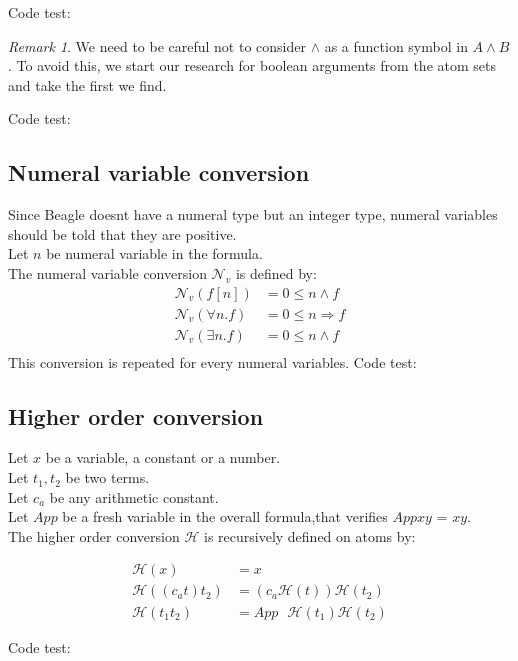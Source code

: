 \documentclass[a4paper, 11pt]{article}
\theoremstyle{plain}
\theoremstyle{definition}
\theoremstyle{remark}
\newtheorem*{remark}{Remark}
\begin{document}
Code test:

\begin{remark}
We need to be careful not to consider $\wedge$ as a function symbol in $A \wedge B$ . To avoid this, we start our research for boolean arguments from the atom sets and take the first we find.
\end{remark}

Code test:

\subsection{Numeral variable conversion}
Since Beagle doesnt have a numeral type but an integer type, numeral variables should be told that they are positive.
\\Let $n$ be numeral variable in the formula.
\\The numeral variable conversion $\mathcal{N}_v$ is defined by:
\[\begin{aligned}
  \mathcal{N}_v(f[n]) &= 0 \leq n \wedge f\\
  \mathcal{N}_v(\forall n. f) &= 0 \leq n \Rightarrow f\\ 
  \mathcal{N}_v(\exists n. f) &= 0 \leq n \wedge f \\
  \end{aligned}
  \]
This conversion is repeated for every numeral variables.
Code test:

\subsection{Higher order conversion}
Let $x$ be a variable, a constant or a number.
\\Let $t_1,t_2$ be two terms.
\\Let $c_a$ be any arithmetic constant.
\\Let $App$ be a fresh variable in the overall formula,that verifies $App x y$ = $x y$.
\\The higher order conversion $\mathcal{H}$ is recursively defined on atoms by:

\[\begin{aligned}
 \mathcal{H}(x) &= x \\
\mathcal{H}((c_a t) t_2) &=  (c_a \mathcal{H}(t)) \mathcal{H}(t_2)    \\
\mathcal{H} (t_1 t_2) &= App\mbox{ } \mathcal{H} (t_1)
\mathcal{H} (t_2)
\end{aligned}\]


Code test:
\end{document}
